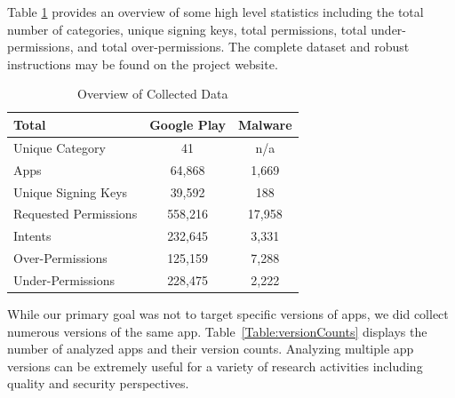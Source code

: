 \documentclass{sig-alternate-05-2015}
\newcommand{\todo}[1]{\textcolor{cyan}{\textbf{[#1]}}}
\begin{document}
Table \ref{Table:overallStats} provides an overview of some high level statistics including the total number of categories, unique signing keys, total permissions, total under-permissions, and total over-permissions. The complete dataset and robust instructions may be found on the project website.


\begin{table}[ht]
\begin{center}
\caption{Overview of Collected Data}
\label{Table:overallStats}
 \begin{tabular}{ | l | c | c |} \hline

	 \bfseries Total & \bfseries   Google Play & \bfseries Malware \\ \hline
	
	Unique Category & 41 & n/a \\ \hline
	Apps &	64,868 & 1,669 \\ \hline
	Unique Signing Keys  & 39,592 & 188 \\ \hline

	Requested Permissions &	558,216 & 17,958 \\ \hline
	Intents &	232,645 & 3,331 \\ \hline
	Over-Permissions   & 125,159 & 7,288 \\ \hline
	Under-Permissions  & 228,475 & 2,222 \\ \hline
	
	
        	 	
  \end{tabular}
\end{center}
\end{table}


While our primary goal was not to target specific versions of apps, we did collect numerous versions of the same app. Table~\ref{Table:versionCounts} displays the number of analyzed apps and their version counts. Analyzing multiple app versions can be extremely useful for a variety of research activities including quality and security perspectives.
\end{document}

